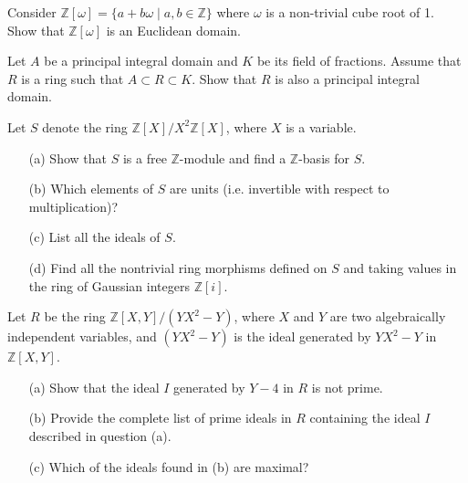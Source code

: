 \begin{prob}[S2009-Q2]
    Consider \(\mathbb{Z}[\omega] = \{a + b\omega \mid a, b \in \mathbb{Z}\}\) where \(\omega\) is a non-trivial cube root of 1. Show that \(\mathbb{Z}[\omega]\) is an Euclidean domain.
\end{prob}


\begin{prob}[F2006-Q3]
    Let \(A\) be a principal integral domain and \(K\) be its field of fractions. Assume that \(R\) is a ring such that \(A \subset R \subset K\). Show that \(R\) is also a principal integral domain.
\end{prob}


\begin{prob}[F2001-Q2]
    Let \(S\) denote the ring \(\mathbb{Z}[X]/X^2\mathbb{Z}[X]\), where \(X\) is a variable.
    \begin{itemize}
        \item[(a)] Show that \(S\) is a free \(\mathbb{Z}\)-module and find a \(\mathbb{Z}\)-basis for \(S\).
        \item[(b)] Which elements of \(S\) are units (i.e. invertible with respect to multiplication)?
        \item[(c)] List all the ideals of \(S\).
        \item[(d)] Find all the nontrivial ring morphisms defined on \(S\) and taking values in the ring of Gaussian integers \(\mathbb{Z}[i]\).
    \end{itemize}
\end{prob}

\begin{prob}[S2001-Q6]
    Let \(R\) be the ring \(\mathbb{Z}[X,Y]/(YX^2-Y)\), where \(X\) and \(Y\) are two algebraically independent variables, and \((YX^2-Y)\) is the ideal generated by \(YX^2-Y\) in \(\mathbb{Z}[X,Y]\).
    \begin{itemize}
        \item[(a)] Show that the ideal \(I\) generated by \(Y-4\) in \(R\) is not prime.
        \item[(b)] Provide the complete list of prime ideals in \(R\) containing the ideal \(I\) described in question (a).
        \item[(c)] Which of the ideals found in (b) are maximal?
    \end{itemize}
\end{prob}

